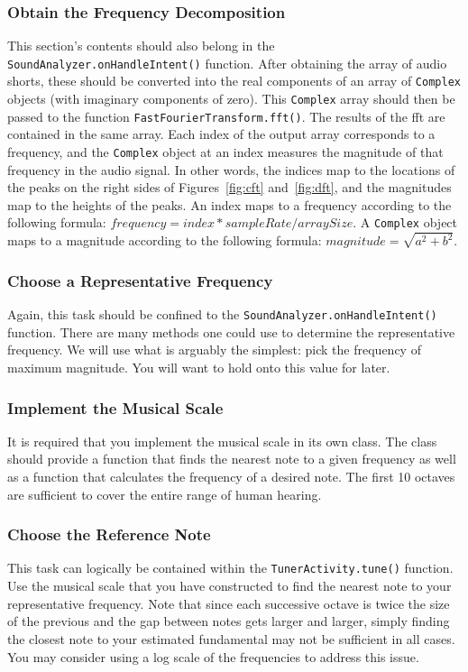 \subsubsection{Obtain the Frequency Decomposition}
This section's contents should also belong in the \verb=SoundAnalyzer.onHandleIntent()= function.
After obtaining the array of audio shorts, these should be converted into the real components of an array of \verb=Complex= objects (with imaginary components of zero).
This \verb=Complex= array should then be passed to the function \verb=FastFourierTransform.fft()=.
The results of the \ac{fft} are contained in the same array.
Each index of the output array corresponds to a frequency, and the \verb=Complex= object at an index measures the magnitude of that frequency in the audio signal.
In other words, the indices map to the locations of the peaks on the right sides of Figures~\ref{fig:cft} and~\ref{fig:dft}, and the magnitudes map to the heights of the peaks.
An index maps to a frequency according to the following formula: $frequency = index*sampleRate/arraySize$.
A \verb=Complex= object maps to a magnitude according to the following formula: $magnitude = \sqrt{a^2 + b^2}$.

\subsubsection{Choose a Representative Frequency}
Again, this task should be confined to the \verb=SoundAnalyzer.onHandleIntent()= function.
There are many methods one could use to determine the representative frequency.
We will use what is arguably the simplest: pick the frequency of maximum magnitude.
You will want to hold onto this value for later.

\subsubsection{Implement the Musical Scale}
It is required that you implement the musical scale in its own class.
The class should provide a function that finds the nearest note to a given frequency as well as a function that calculates the frequency of a desired note.
The first 10 octaves are sufficient to cover the entire range of human hearing.

\subsubsection{Choose the Reference Note}
This task can logically be contained within the \verb=TunerActivity.tune()= function.
Use the musical scale that you have constructed to find the nearest note to your representative frequency.
Note that since each successive octave is twice the size of the previous and the gap between notes gets larger and larger, simply finding the closest note to your estimated fundamental may not be sufficient in all cases.
You may consider using a log scale of the frequencies to address this issue.

